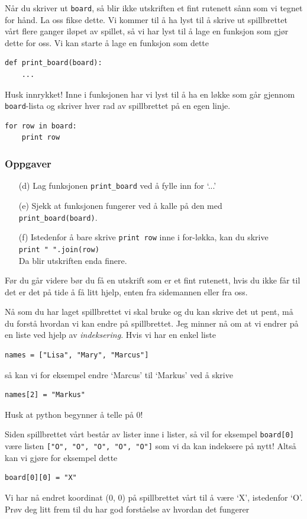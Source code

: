 \documentclass[a4paper, 11pt, notitlepage]{article}
\begin{document}
Når du skriver ut \verb+board+, så blir ikke utskriften et fint rutenett sånn som vi tegnet for hånd. La oss fikse dette. Vi kommer til å ha lyst til å skrive ut spillbrettet vårt flere ganger iløpet av spillet, så vi har lyst til å lage en funksjon som gjør dette for oss. Vi kan starte å lage en funksjon som dette
\begin{lstlisting}
def print_board(board):
	...
\end{lstlisting}
Husk innrykket! Inne i funksjonen har vi lyst til å ha en løkke som går gjennom \verb+board+-lista og skriver hver rad av spillbrettet på en egen linje.
\begin{lstlisting}
for row in board:
	print row
\end{lstlisting}

\subsubsection*{Oppgaver}
\begin{itemize}
	\item[(d)] Lag funksjonen \verb+print_board+ ved å fylle inn for `...'
	\item[(e)] Sjekk at funksjonen fungerer ved å kalle på den med \verb+print_board(board)+. 
	\item[(f)] Istedenfor å bare skrive \verb+print row+ inne i for-løkka, kan du skrive \\[0.2cm] \verb+print " ".join(row)+ \\[0.2cm]
	 Da blir utskriften enda finere.
\end{itemize}
Før du går videre bør du få en utskrift som er et fint rutenett, hvis du ikke får til det er det på tide å få litt hjelp, enten fra sidemannen eller fra oss.

Nå som du har laget spillbrettet vi skal bruke og du kan skrive det ut pent, må du forstå hvordan vi kan endre på spillbrettet. Jeg minner nå om at vi endrer på en liste ved hjelp av \emph{indeksering}. Hvis vi har en enkel liste
\begin{lstlisting}
names = ["Lisa", "Mary", "Marcus"]
\end{lstlisting}
så kan vi for eksempel endre `Marcus' til `Markus' ved å skrive
\begin{lstlisting}
names[2] = "Markus"
\end{lstlisting}
Husk at python begynner å telle på 0!

Siden spillbrettet vårt består av lister inne i lister, så vil for eksempel \verb+board[0]+ være listen \verb+["O", "O", "O", "O", "O"]+ som vi da kan indeksere på nytt! Altså kan vi gjøre for eksempel dette 
\begin{lstlisting}
board[0][0] = "X"
\end{lstlisting}
Vi har nå endret koordinat (0, 0) på spillbrettet vårt til å være `X', istedenfor `O'. Prøv deg litt frem til du har god forståelse av hvordan det fungerer
\end{document}
